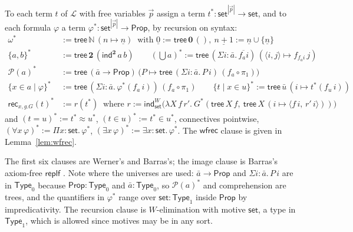 \documentclass[10pt]{article}
\newcommand{\N}{\mathbb{N}}
\newcommand{\Prop}{\mathsf{Prop}}
\newcommand{\Type}{\mathsf{Type}}
\newcommand{\PP}{\mathcal{P}}
\newcommand{\rec}{\mathsf{rec}}
\newcommand{\wfrec}{\mathsf{wfrec}}
\newcommand{\Lang}{\mathcal L}
\begin{document}
\begin{definition}[interpretation of $\Lang$]\label{def:star}
To each term $t$ of $\Lang$ with free variables $\vec p$ assign a term
$t^*:\mathsf{set}^{|\vec p|}\to\mathsf{set}$, and to each formula
$\varphi$ a term $\varphi^*:\mathsf{set}^{|\vec p|}\to\Prop$, by recursion
on syntax:
\begin{align*}
\omega^* &:= \mathsf{tree}\,\N\,(n\mapsto\underline n)\ \text{ with }\underline 0:=\mathsf{tree}\,\mathbf 0\,(),\ \underline{n+1}:=\underline n\cup\{\underline n\}\\
\{a,b\}^* &:= \mathsf{tree}\,\mathbf 2\,(\mathsf{ind}^{\mathbf 2}\,a\,b)\qquad
(\textstyle\bigcup a)^* := \mathsf{tree}\,(\Sigma i{:}\bar a.\,\overline{f_a i})\,(\langle i,j\rangle\mapsto f_{f_a i}\,j)\\
\PP(a)^* &:= \mathsf{tree}\,(\bar a\to\Prop)\,\bigl(P\mapsto\mathsf{tree}\,(\Sigma i{:}\bar a.\,P\,i)\,(f_a\circ\pi_1)\bigr)\\
\{x\in a\mid\varphi\}^* &:= \mathsf{tree}\,(\Sigma i{:}\bar a.\,\varphi^*(f_a\,i))\,(f_a\circ\pi_1)\qquad
\{t\mid x\in u\}^* := \mathsf{tree}\,\bar u\,(i\mapsto t^*(f_u\,i))\\
\rec_{x,g.G}(t)^* &:= r(t^*)\ \text{ where } r:=\mathsf{ind}^W_{\mathsf{set}}\bigl(\lambda X\,f\,r'.\ G^*(\mathsf{tree}\,X\,f,\ \mathsf{tree}\,X\,(i\mapsto\langle f\,i,\,r'\,i\rangle))\bigr)
\end{align*}
and $(t=u)^*:=t^*\approx u^*$, $(t\in u)^*:=t^*\in u^*$, connectives
pointwise, $(\forall x\,\varphi)^*:=\Pi x{:}\mathsf{set}.\,\varphi^*$,
$(\exists x\,\varphi)^*:=\exists x{:}\mathsf{set}.\,\varphi^*$. The
$\wfrec$ clause is given in Lemma~\ref{lem:wfrec}.
\end{definition}

The first six clauses are Werner's and Barras's; the image clause is
Barras's axiom-free $\mathsf{replf}$ \cite{barras10}. Note where the
universes are used: $\bar a\to\Prop$ and $\Sigma i{:}\bar a.\,P\,i$ are in
$\Type_0$ because $\Prop:\Type_0$ and $\bar a:\Type_0$, so $\PP(a)^*$ and
comprehension are trees, and the quantifiers in $\varphi^*$ range over
$\mathsf{set}:\Type_1$ inside $\Prop$ by impredicativity. The recursion
clause is $W$-elimination with motive $\mathsf{set}$, a type in $\Type_1$,
which is allowed since motives may be in any sort.
\end{document}
